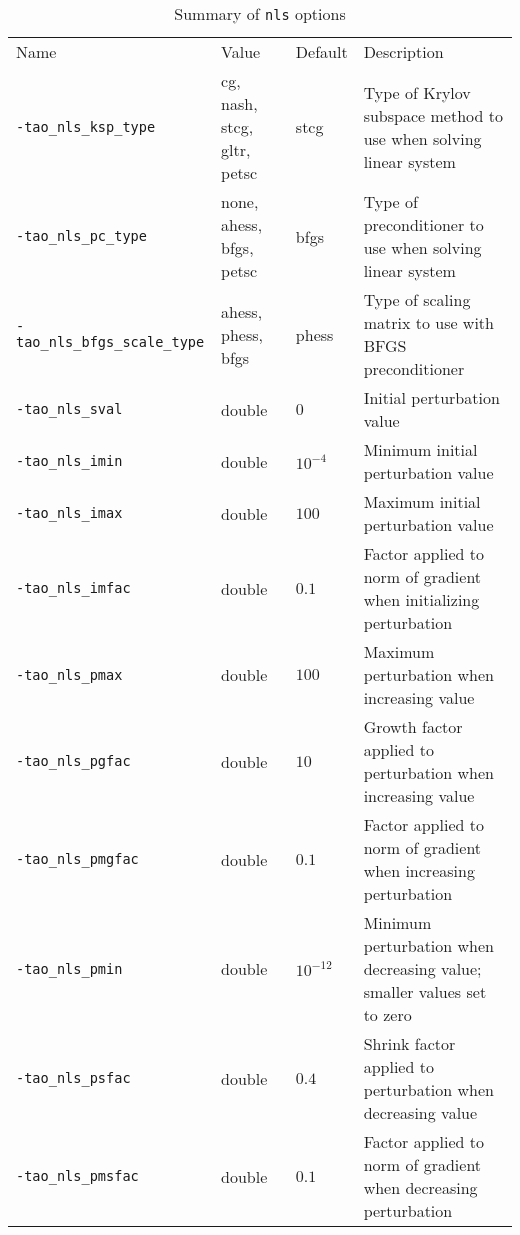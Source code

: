 \begin{table}[h]
\caption{Summary of {\tt nls} options}
\begin{tabular}{l|p{1.5in}|l|p{2.0in}}
Name & Value & Default & Description \\
{\tt -tao\_nls\_ksp\_type} & cg, nash, stcg, gltr, petsc & stcg & Type of Krylov subspace method to use when solving linear system \\
{\tt -tao\_nls\_pc\_type} & none, ahess, bfgs, petsc & bfgs & Type of preconditioner to use when solving linear system \\
{\tt -tao\_nls\_bfgs\_scale\_type} & ahess, phess, bfgs & phess & Type of scaling matrix to use with BFGS preconditioner \\
{\tt -tao\_nls\_sval} & double & $0$ & Initial perturbation value \\
{\tt -tao\_nls\_imin} & double & $10^{-4}$ & Minimum initial perturbation value \\
{\tt -tao\_nls\_imax} & double & $100$ & Maximum initial perturbation value \\
{\tt -tao\_nls\_imfac} & double & $0.1$ & Factor applied to norm of gradient when initializing perturbation \\
{\tt -tao\_nls\_pmax} & double & $100$ & Maximum perturbation when increasing value \\
{\tt -tao\_nls\_pgfac} & double & $10$ & Growth factor applied to perturbation when increasing value \\
{\tt -tao\_nls\_pmgfac} & double & $0.1$ & Factor applied to norm of gradient when increasing perturbation \\
{\tt -tao\_nls\_pmin} & double & $10^{-12}$ & Minimum perturbation when decreasing value; smaller values set to zero \\
{\tt -tao\_nls\_psfac} & double & $0.4$ & Shrink factor applied to perturbation when decreasing value \\
{\tt -tao\_nls\_pmsfac} & double & $0.1$ & Factor applied to norm of gradient when decreasing perturbation \\
\end{tabular}
\end{table}

